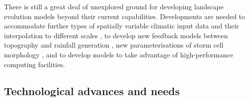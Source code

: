There is still a great deal of unexplored ground for developing landscape evolution models beyond their current capabilities.  Developments are needed to accommodate further types of spatially variable climatic input data and their interpolation to different scales \citep[e.g.][]{von2014effects,coulthard2016sensitivity}, to develop new feedback models between topography and rainfall generation \citep[e.g.][]{han2015measuring}, new parameterisations of storm cell morphology \citep[e.g.][]{solyom2007importance}, and to develop models to take advantage of high-performance computing facilities.

\subsection{Technological advances and needs}


